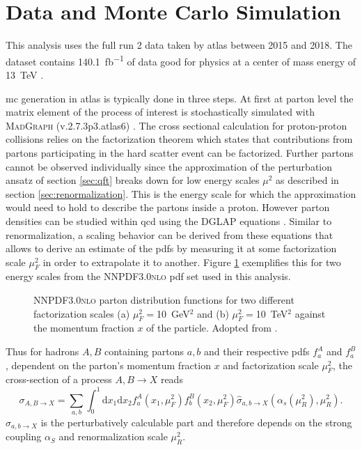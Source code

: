 \section{Data and Monte Carlo Simulation}\label{sec:mc_simulation}
This analysis uses the full run 2 data taken by \ac{atlas} between 2015 and 2018. The dataset contains \qty[]{140.1}{fb^{-1}} of data good for physics at a center of mass energy of \qty[]{13}{TeV} \citep{DAPR-2021-01}.

\ac{mc} generation in \ac{atlas} is typically done in three steps. At first at parton level the matrix element of the process of interest is stochastically simulated with \textsc{MadGraph} (v.2.7.3p3.atlas6) \citep{alwall2014automated}. The cross sectional calculation for proton-proton collisions relies on the factorization theorem \citep{halzen1984introductory} which states that contributions from partons participating in the hard scatter event can be factorized. Further partons cannot be observed individually since the approximation of the perturbation ansatz of section \ref{sec:qft} breaks down for low energy scales $\mu^2$ as described in section \ref{sec:renormalization}. This is the energy scale for which the approximation would need to hold to describe the partons inside a proton. However parton densities can be studied within \ac{qcd} using the DGLAP equations \citep{thomson2013modern}. Similar to renormalization, a scaling behavior can be derived from these equations that allows to derive an estimate of the \acp{pdf} by measuring it at some factorization scale $\mu_F^2$ in order to extrapolate it to another. Figure \ref{fig:pdf} exemplifies this for two energy scales from the \textsc{NNPDF3.0nlo} \ac{pdf} set used in this analysis.
\begin{figure}
    \centering
    \caption[]{\textsc{NNPDF3.0nlo} parton distribution functions for two different factorization scales (a) $\mu_F^2=$\qty{10}{GeV}$^2$ and (b) $\mu_F^2=$\qty{10}{TeV}$^2$ against the momentum fraction $x$ of the particle. Adopted from \citep{PhysRevD.98.030001}.}
    \label{fig:pdf}
\end{figure}
Thus for hadrons $A,B$ containing partons $a,b$ and their respective \acp{pdf} $f_{a}^A$ and $f_{a}^B$, dependent on the parton's momentum fraction $x$ and factorization scale $\mu_F^2$, the cross-section of a process $A,B\rightarrow X$ reads
\begin{equation}
    \sigma_{A,B\rightarrow X} = \sum_{a,b} \int_0^1 \text{d}x_1\text{d}x_2 f_a^A(x_1,\mu_F^2) f_b^B(x_2,\mu_F^2) \hat{\sigma}_{a,b\rightarrow X}(\alpha_s(\mu_R^2),\mu_R^2).
\end{equation}
$\hat{\sigma}_{a,b\rightarrow X}$ is the perturbatively calculable part and therefore depends on the strong coupling $\alpha_S$ and renormalization scale $\mu_R^2$.

